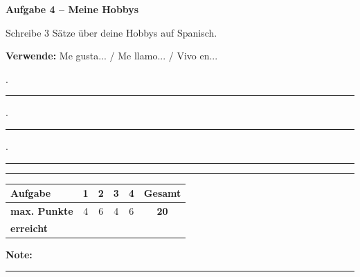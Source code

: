 \documentclass[11pt, a4paper]{article}
\newcommand{\fachfarbe}{spanisch}
\newcommand{\punktebox}[1]{\hfill\fbox{\small \_/#1}}
\newcommand{\luecke}[1]{\rule{#1}{0.4pt}}
\newenvironment{aufgabe}[1]{%
    \needspace{5\baselineskip}%
    \nopagebreak[4]%
    \vspace{10pt}
    \noindent\textbf{\textcolor{\fachfarbe}{Aufgabe #1}}
    \nopagebreak[4]%
    \vspace{5pt}
    \nopagebreak[4]%
    \begin{list}{}{\leftmargin=0pt}
    \item[]
}{%
    \end{list}
}
\begin{document}
\begin{aufgabe}{4 -- Meine Hobbys}
Schreibe 3 Sätze über deine Hobbys auf Spanisch. \punktebox{6}
\end{aufgabe}

\noindent
\textbf{Verwende:} Me gusta... / Me llamo... / Vivo en...

\vspace{0.8em}

. \luecke{12cm}

\vspace{1em}

. \luecke{12cm}

\vspace{1em}

. \luecke{12cm}


\vspace{25pt}
\hrule
\vspace{10pt}

\noindent
\begin{tabularx}{\textwidth}{|X|c|c|c|c||c|}
\hline
\textbf{Aufgabe} & 1 & 2 & 3 & 4 & \textbf{Gesamt} \\
\hline
\textbf{max. Punkte} & 4 & 6 & 4 & 6 & \textbf{20} \\
\hline
\textbf{erreicht} & & & & & \\[0.8em]
\hline
\end{tabularx}

\vspace{10pt}

\begin{flushright}
\textbf{Note:} \luecke{2cm}
\end{flushright}
\end{document}
